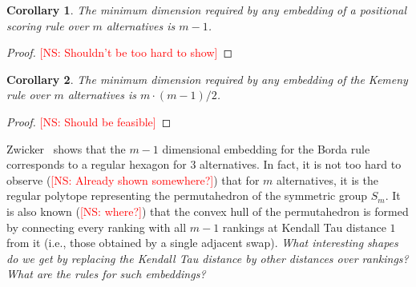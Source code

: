 \documentclass[10pt,letterpaper]{article}
\newcommand{\calL}{{\mathcal{L}}}
\newcommand{\rank}{{\calL(A)}}
\newtheorem{corollary}{Corollary}
\newcommand{\kibitz}[2]{\ifnum\Comments=1\textcolor{#1}{#2}\fi}
\newcommand{\cns}[1]{\kibitz{red} {[NS: #1]}}
\begin{document}
%
%

\begin{corollary}
The minimum dimension required by any embedding of a positional scoring rule over $m$ alternatives is $m-1$.
\end{corollary}
\begin{proof}
\cns{Shouldn't be too hard to show}
\end{proof}
%

\begin{corollary}
The minimum dimension required by any embedding of the Kemeny rule over $m$ alternatives is $m\cdot(m-1)/2$.
\end{corollary}
\begin{proof}
\cns{Should be feasible}
\end{proof}

Zwicker~\cite{Zwicker08a} shows that the $m-1$ dimensional embedding for the Borda rule corresponds to a regular hexagon for $3$ alternatives. In fact, it is not too hard to observe (\cns{Already shown somewhere?}) that for $m$ alternatives, it is the regular polytope representing the permutahedron of the symmetric group $S_m$. It is also known (\cns{where?}) that the convex hull of the permutahedron is formed by connecting every ranking with all $m-1$ rankings at Kendall Tau distance $1$ from it (i.e., those obtained by a single adjacent swap). \emph{What interesting shapes do we get by replacing the Kendall Tau distance by other distances over rankings? What are the rules for such embeddings?}
\end{document}

